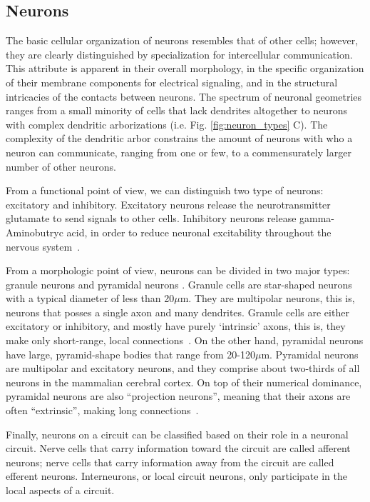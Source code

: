 \subsection{Neurons}
The basic cellular organization of neurons resembles that of other cells; however,
they are clearly distinguished by specialization for intercellular communication.
This attribute is apparent in their overall morphology, in the specific
organization of their membrane components for electrical signaling, and in the
structural intricacies of the contacts between neurons. The spectrum of neuronal
geometries ranges from a small minority of cells that lack dendrites altogether
to neurons with complex dendritic arborizations (i.e. Fig. \ref{fig:neuron_types} C).
The complexity of the dendritic arbor constrains the amount of neurons with who
a neuron can communicate, ranging from one or few, to a commensurately larger
number of other neurons.

From a functional point of view, we can distinguish two type of neurons:
excitatory and inhibitory. Excitatory neurons release the neurotransmitter
glutamate to send signals to other cells. Inhibitory neurons release
gamma-Aminobutryc acid, in order to reduce neuronal excitability throughout
the nervous system~\cite{Bekkers2011}.

From a morphologic point of view, neurons can be divided in two major types:
granule neurons and pyramidal neurons \cite{Purves2004}. Granule cells are 
star-shaped neurons with a typical diameter of less than 20$\mu$m. They are
multipolar neurons, this is, neurons that posses a single axon and many dendrites.
Granule cells are either excitatory or inhibitory, and mostly have purely
‘intrinsic’ axons, this is, they make only short-range, local connections~\cite{Purves2004}.
On the other hand, pyramidal neurons have large, pyramid-shape bodies that
range from 20-120$\mu$m. Pyramidal neurons are multipolar and excitatory neurons,
and they comprise about two-thirds of all neurons in the mammalian cerebral cortex.
On top of their numerical dominance, pyramidal neurons are also ``projection neurons'',
meaning that their axons are often ``extrinsic'', making long connections~\cite{Purves2004}.

Finally, neurons on a circuit can be classified based on their role in a 
neuronal circuit. Nerve cells that carry information toward the circuit are
called afferent neurons; nerve cells that carry information away from the 
circuit are called efferent neurons. Interneurons, or local circuit neurons,
only participate in the local aspects of a circuit.

